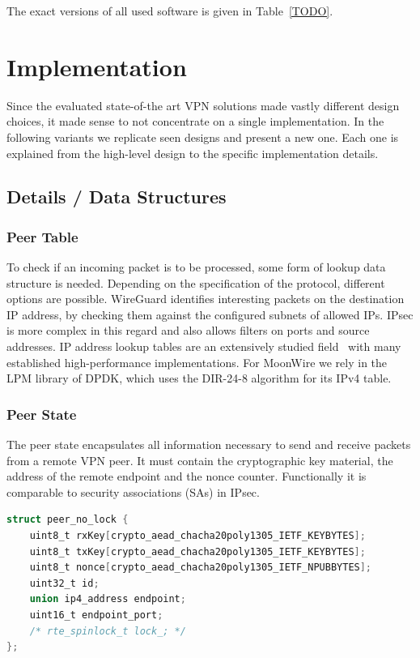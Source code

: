 The exact versions of all used software is given in Table~\ref{TODO}.

\section{Implementation}
Since the evaluated state-of-the art VPN solutions made vastly different design choices, it made sense to not concentrate on a single implementation. In the following variants we replicate seen designs and present a new one. Each one is explained from the high-level design to the specific implementation details.

\subsection{Details / Data Structures}

\subsubsection{Peer Table}

To check if an incoming packet is to be processed, some form of lookup data structure is needed. Depending on the specification of the protocol, different options are possible. 
WireGuard identifies interesting packets on the destination IP address, by checking them against the configured subnets of allowed IPs. IPsec is more complex in this regard and also allows filters on ports and source addresses.
IP address lookup tables are an extensively studied field~\cite{} with many established high-performance implementations.
For MoonWire we rely in the LPM library of DPDK, which uses the DIR-24-8 algorithm for its IPv4 table.

\subsubsection{Peer State}

The peer state encapsulates all information necessary to send and receive packets from a remote VPN peer. It must contain the cryptographic key material, the address of the remote endpoint and the nonce counter.
Functionally it is comparable to security associations (SAs) in IPsec.

\begin{lstlisting}[caption={Definition of the peer struct without locks},captionpos=b,label={lst:moonwire-peer-struct},language=C]
struct peer_no_lock {
	uint8_t rxKey[crypto_aead_chacha20poly1305_IETF_KEYBYTES];
	uint8_t txKey[crypto_aead_chacha20poly1305_IETF_KEYBYTES];
	uint8_t nonce[crypto_aead_chacha20poly1305_IETF_NPUBBYTES];
	uint32_t id;
	union ip4_address endpoint;
	uint16_t endpoint_port;
	/* rte_spinlock_t lock_; */
};
\end{lstlisting}

